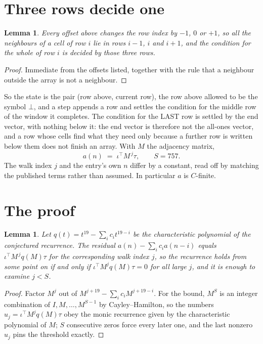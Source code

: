 \documentclass[11pt,a4paper]{article}
\theoremstyle{plain}
\newtheorem{lemma}[theorem]{Lemma}
\theoremstyle{definition}
\begin{document}
\section{Three rows decide one}

\begin{lemma}\label{lem:win}
Every offset above changes the row index by $-1$, $0$ or $+1$, so all the neighbours of a cell
of row $i$ lie in rows $i-1$, $i$ and $i+1$, and the condition for the whole of row $i$ is
decided by those three rows.
\end{lemma}

\begin{proof}
Immediate from the offsets listed, together with the rule that a neighbour outside the array is
not a neighbour.
\end{proof}

So the state is the pair (row above, current row), the row above allowed to be the symbol
$\bot$, and a step appends a row and settles the condition for the middle row of the window it
completes. The condition for the LAST row is settled by the end vector, with nothing below it:
the end vector is therefore not the all-ones vector, and a row whose cells find what they need
only because a further row is written below them does not finish an array. With $M$ the
adjacency matrix,
\[
a(n)\;=\;\iota^{\!\top}M^{\,j}\tau ,\qquad S=757.
\]
The walk index $j$ and the entry's own $n$ differ by a constant, read off by matching the
published terms rather than assumed. In particular $a$ is $C$-finite.

\section{The proof}

\begin{lemma}\label{lem:crit}
Let $q(t)=t^{19}-\sum_i c_it^{19-i}$ be the characteristic polynomial of the
conjectured recurrence. The residual $a(n)-\sum_ic_ia(n-i)$ equals
$\iota^{\!\top}M^{\,j}q(M)\tau$ for the corresponding walk index $j$, so the recurrence
holds from some point on if and only if $\iota^{\!\top}M^{j}q(M)\tau=0$ for all large $j$,
and it is enough to examine $j<S$.
\end{lemma}

\begin{proof}
Factor $M^{j}$ out of $M^{j+19}-\sum_ic_iM^{j+19-i}$. For the bound, $M^{S}$
is an integer combination of $I,M,\dots,M^{S-1}$ by Cayley--Hamilton, so the numbers
$u_j=\iota^{\!\top}M^{j}q(M)\tau$ obey the monic recurrence given by the characteristic
polynomial of $M$; $S$ consecutive zeros force every later one, and the last nonzero $u_j$
pins the threshold exactly.
\end{proof}
\end{document}
